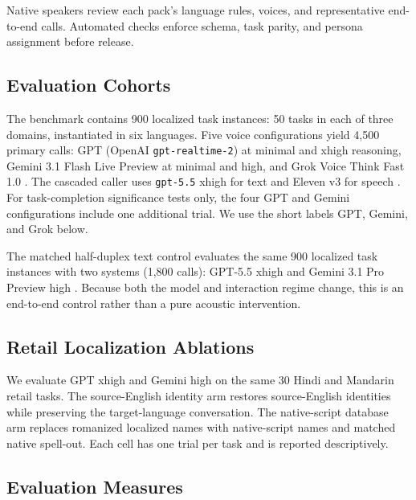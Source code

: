 \documentclass{article}
\begin{document}
Native speakers review each pack's language rules, voices, and
representative end-to-end calls.
Automated checks enforce schema, task parity, and persona assignment before
release.

\subsection{Evaluation Cohorts}

The benchmark contains 900 localized task instances: 50 tasks in each of
three domains, instantiated in six languages. Five voice configurations yield
4,500 primary calls: GPT (OpenAI \texttt{gpt-realtime-2}) at minimal and xhigh reasoning,
Gemini 3.1 Flash Live Preview at minimal and high, and Grok Voice Think Fast
1.0 \cite{openai2026gptrealtime2,google2026gemini31flashlive,xai2026grokvoicethinkfast}.
The cascaded caller uses \texttt{gpt-5.5} xhigh for text and Eleven v3 for speech
\cite{openai2026gpt55,elevenlabs2026elevenv3}. For task-completion significance
tests only, the four GPT and Gemini configurations include one additional trial.
We use the short labels GPT, Gemini, and Grok below.

The matched half-duplex text control evaluates the same 900 localized task
instances with two systems (1,800 calls): GPT-5.5
xhigh and Gemini 3.1 Pro Preview high
\cite{openai2026gpt55,google2026gemini31pro}. Because both the model and
interaction regime change, this is an end-to-end control rather than a pure
acoustic intervention.

\subsection{Retail Localization Ablations}

We evaluate GPT xhigh and Gemini high on the same 30 Hindi and Mandarin
retail tasks. The source-English identity arm restores source-English identities
while preserving the target-language conversation. The native-script database
arm replaces romanized localized names with native-script names and matched
native spell-out. Each cell has one trial per task and is reported
descriptively.


\subsection{Evaluation Measures}
\end{document}
